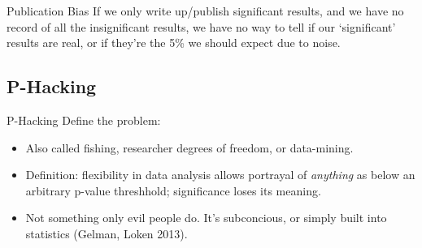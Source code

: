 \documentclass{beamer}
\begin{document}
{ %
    \begin{frame}[plain]
     \end{frame}
}




\begin {frame}{Publication Bias}
If we only write up/publish significant results, and we have no record of all the insignificant results, we have no way to tell if our `significant' results are real, or if they're the 5\% we should expect due to noise.
\end{frame}
\subsection*{P-Hacking}
\begin{frame}[<.->]{P-Hacking}
Define the problem:
\begin{itemize}
\item
Also called fishing, researcher degrees of freedom, or data-mining.
\item
Definition: flexibility in data analysis allows portrayal of \textit{anything} as below an arbitrary p-value threshhold; significance loses its meaning.
\item
Not something only evil people do. It's subconcious, or simply built into statistics (Gelman, Loken 2013).
\end{itemize}
\end{frame}
\end{document}
